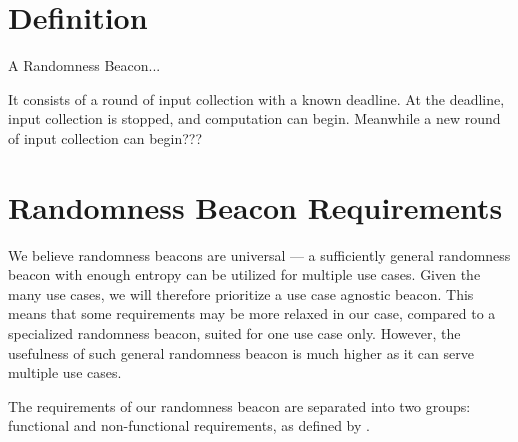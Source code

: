 \section{Definition}

A Randomness Beacon... 

It consists of a round of input collection with a known deadline. At the deadline, input collection is stopped, and computation can begin. Meanwhile a new round of input collection can begin???

\section{Randomness Beacon Requirements}
\label{sec:beacon_requirements}

We believe randomness beacons are universal --- a sufficiently general randomness beacon with enough entropy can be utilized for multiple use cases. Given the many use cases, we will therefore prioritize a use case agnostic beacon.
This means that some requirements may be more relaxed in our case, compared to a specialized randomness beacon, suited for one use case only. However, the usefulness of such general randomness beacon is much higher as it can serve multiple use cases.

The requirements of our randomness beacon are separated into two groups: functional and non-functional requirements, as defined by \citet[1.4.1]{swebok} .

